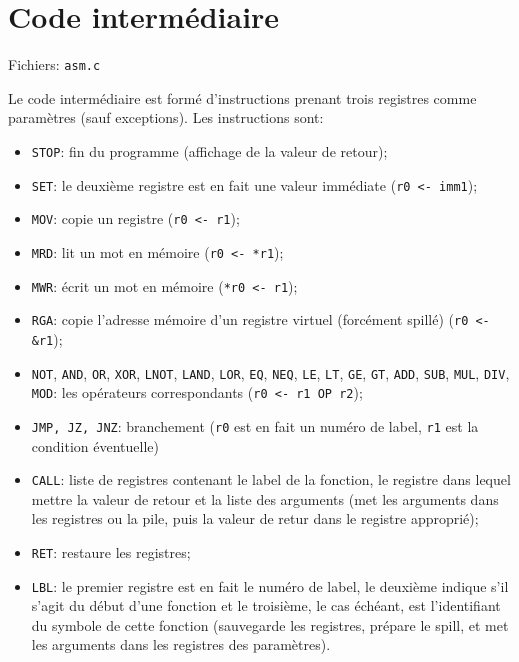 \documentclass{article}
\begin{document}
	\section{Code intermédiaire}
		\par Fichiers: \verb#asm.c#
		\par Le code intermédiaire est formé d'instructions prenant trois registres comme paramètres (sauf exceptions). Les instructions sont:
		\begin{itemize}
			\item \verb#STOP#: fin du programme (affichage de la valeur de retour);
			\item \verb#SET#: le deuxième registre est en fait une valeur immédiate (\verb#r0 <- imm1#);
			\item \verb#MOV#: copie un registre (\verb#r0 <- r1#);
			\item \verb#MRD#: lit un mot en mémoire (\verb#r0 <- *r1#);
			\item \verb#MWR#: écrit un mot en mémoire (\verb#*r0 <- r1#);
			\item \verb#RGA#: copie l'adresse mémoire d'un registre virtuel (forcément spillé) (\verb#r0 <- &r1#);
			\item \verb#NOT#, \verb#AND#, \verb#OR#, \verb#XOR#, \verb#LNOT#, \verb#LAND#, \verb#LOR#, \verb#EQ#, \verb#NEQ#, \verb#LE#, \verb#LT#, \verb#GE#, \verb#GT#, \verb#ADD#, \verb#SUB#, \verb#MUL#, \verb#DIV#, \verb#MOD#: les opérateurs correspondants (\verb#r0 <- r1 OP r2#);
			\item \verb#JMP, JZ, JNZ#: branchement (\verb#r0# est en fait un numéro de label, \verb#r1# est la condition éventuelle)
			\item \verb#CALL#: liste de registres contenant le label de la fonction, le registre dans lequel mettre la valeur de retour et la liste des arguments (met les arguments dans les registres ou la pile, puis la valeur de retur dans le registre approprié);
			\item \verb#RET#: restaure les registres;
			\item \verb#LBL#: le premier registre est en fait le numéro de label, le deuxième indique s'il s'agit du début d'une fonction et le troisième, le cas échéant, est l'identifiant du symbole de cette fonction (sauvegarde les registres, prépare le spill, et met les arguments dans les registres des paramètres).
		\end{itemize}
\end{document}
